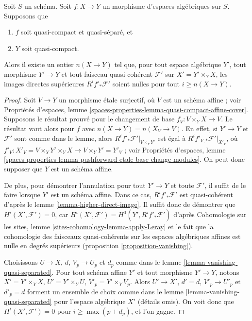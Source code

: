 \begin{lemma}
\label{lemma-vanishing-higher-direct-images}
Soit $S$ un schéma. Soit $f : X \to Y$ un
morphisme d'espaces algébriques sur $S$.
Supposons que
\begin{enumerate}
\item $f$ soit quasi-compact et quasi-séparé, et
\item $Y$ soit quasi-compact.
\end{enumerate}
Alors il existe un entier $n(X \to Y)$ tel que,
pour tout espace algébrique $Y'$, tout morphisme $Y' \to Y$
et tout faisceau quasi-cohérent $\mathcal{F}'$ sur $X' = Y' \times_Y X$,
les images directes supérieures $R^if'_*\mathcal{F}'$ soient nulles pour tout
$i \geq n(X \to Y)$.
\end{lemma}

\begin{proof}
Soit $V \to Y$ un morphisme \'etale surjectif, où $V$ est un schéma
affine ; voir
Propriétés d'espaces, lemme
\ref{spaces-properties-lemma-quasi-compact-affine-cover}.
Supposons le résultat prouvé pour le changement de base $f_V : V \times_Y X \to V$.
Le résultat vaut alors pour $f$ avec $n(X \to Y) = n(X_V \to V)$.
En effet, si $Y' \to Y$ et $\mathcal{F}'$ sont comme dans le lemme, alors
$R^if'_*\mathcal{F}'|_{V \times_Y Y'}$ est égal à
$R^if'_{V, *}\mathcal{F}'|_{X'_V}$, où
$f'_V : X'_V = V \times_Y Y' \times_Y X \to V \times_Y Y' = Y'_V$ ; voir
Propriétés d'espaces,
lemme \ref{spaces-properties-lemma-pushforward-etale-base-change-modules}.
On peut donc supposer que $Y$ est un schéma affine.

\medskip\noindent
De plus, pour démontrer l'annulation pour tout $Y' \to Y$ et toute
$\mathcal{F}'$, il suffit de le faire lorsque $Y'$ est un schéma affine.
Dans ce cas, $R^if'_*\mathcal{F}'$ est quasi-cohérent d'après
le lemme \ref{lemma-higher-direct-image}.
Il suffit donc de démontrer que $H^i(X', \mathcal{F}') = 0$, car
$H^i(X', \mathcal{F}') = H^0(Y', R^if'_*\mathcal{F}')$ d'après
Cohomologie sur les sites, lemme \ref{sites-cohomology-lemma-apply-Leray}
et le fait que la cohomologie des faisceaux quasi-cohérents
sur les espaces algébriques affines est nulle en degrés supérieurs
(proposition \ref{proposition-vanishing}).

\medskip\noindent
Choisissons $U \to X$, $d$, $V_p \to U_p$ et $d_p$ comme dans
le lemme \ref{lemma-vanishing-quasi-separated}.
Pour tout schéma affine $Y'$ et tout morphisme $Y' \to Y$, notons
$X' = Y' \times_Y X$, $U' = Y' \times_Y U$, $V'_p = Y' \times_Y V_p$.
Alors $U' \to X'$, $d' = d$, $V'_p \to U'_p$ et $d'_p = d$
forment un ensemble de choix comme dans
le lemme \ref{lemma-vanishing-quasi-separated}
pour l'espace algébrique $X'$ (détails omis).
On voit donc que $H^i(X', \mathcal{F}') = 0$ pour $i \geq \max(p + d_p)$,
et l'on gagne.
\end{proof}

